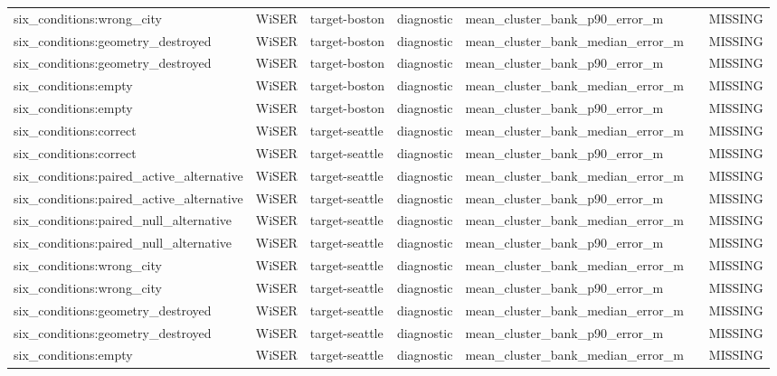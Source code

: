 \begin{longtable}{lllllll}
six\_conditions:wrong\_city & WiSER & target-boston & diagnostic & mean\_cluster\_bank\_p90\_error\_m &  & MISSING \\
six\_conditions:geometry\_destroyed & WiSER & target-boston & diagnostic & mean\_cluster\_bank\_median\_error\_m &  & MISSING \\
six\_conditions:geometry\_destroyed & WiSER & target-boston & diagnostic & mean\_cluster\_bank\_p90\_error\_m &  & MISSING \\
six\_conditions:empty & WiSER & target-boston & diagnostic & mean\_cluster\_bank\_median\_error\_m &  & MISSING \\
six\_conditions:empty & WiSER & target-boston & diagnostic & mean\_cluster\_bank\_p90\_error\_m &  & MISSING \\
six\_conditions:correct & WiSER & target-seattle & diagnostic & mean\_cluster\_bank\_median\_error\_m &  & MISSING \\
six\_conditions:correct & WiSER & target-seattle & diagnostic & mean\_cluster\_bank\_p90\_error\_m &  & MISSING \\
six\_conditions:paired\_active\_alternative & WiSER & target-seattle & diagnostic & mean\_cluster\_bank\_median\_error\_m &  & MISSING \\
six\_conditions:paired\_active\_alternative & WiSER & target-seattle & diagnostic & mean\_cluster\_bank\_p90\_error\_m &  & MISSING \\
six\_conditions:paired\_null\_alternative & WiSER & target-seattle & diagnostic & mean\_cluster\_bank\_median\_error\_m &  & MISSING \\
six\_conditions:paired\_null\_alternative & WiSER & target-seattle & diagnostic & mean\_cluster\_bank\_p90\_error\_m &  & MISSING \\
six\_conditions:wrong\_city & WiSER & target-seattle & diagnostic & mean\_cluster\_bank\_median\_error\_m &  & MISSING \\
six\_conditions:wrong\_city & WiSER & target-seattle & diagnostic & mean\_cluster\_bank\_p90\_error\_m &  & MISSING \\
six\_conditions:geometry\_destroyed & WiSER & target-seattle & diagnostic & mean\_cluster\_bank\_median\_error\_m &  & MISSING \\
six\_conditions:geometry\_destroyed & WiSER & target-seattle & diagnostic & mean\_cluster\_bank\_p90\_error\_m &  & MISSING \\
six\_conditions:empty & WiSER & target-seattle & diagnostic & mean\_cluster\_bank\_median\_error\_m &  & MISSING \\

\end{longtable}
